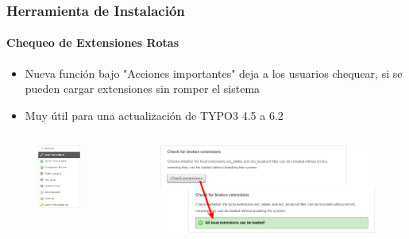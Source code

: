 \begin{frame}[fragile]
	\frametitle{Herramienta de Instalación}
	\framesubtitle{Chequeo de Extensiones Rotas}

	\begin{itemize}
		\item Nueva función bajo "Acciones importantes" deja a los usuarios chequear, si se pueden cargar extensiones sin romper el sistema
		\item Muy útil para una actualización de TYPO3 4.5 a 6.2
	\end{itemize}

	\begin{columns}[T]
		\begin{column}{.3\textwidth}
			\begin{figure}\vspace*{-0.4cm}
				\includegraphics[width=0.7\linewidth]{Images/InstallTool/ImportantActions.png}
			\end{figure}
		\end{column}
		\begin{column}{.7\textwidth}
			\begin{figure}\vspace*{-0.4cm}
				\includegraphics[width=1\linewidth]{Images/InstallTool/CheckForBrokenExtensions.png}
			\end{figure}
		\end{column}
	\end{columns}


\end{frame}

